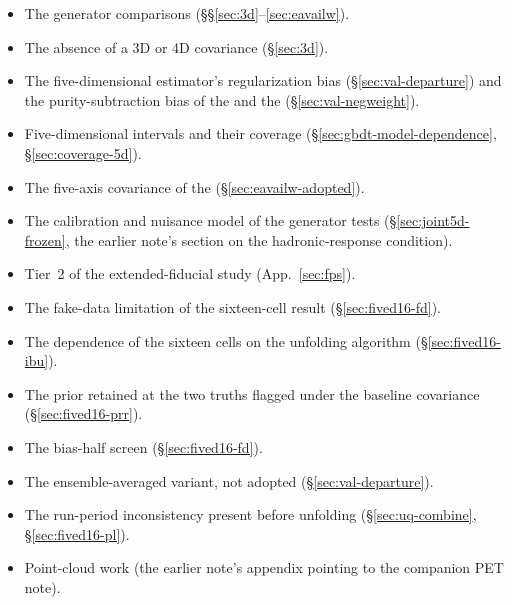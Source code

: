 \begin{itemize}
\item The generator comparisons (\S\S\ref{sec:3d}--\ref{sec:eavailw}).
\item The absence of a 3D or 4D covariance (\S\ref{sec:3d}).
\item The five-dimensional estimator's regularization bias (\S\ref{sec:val-departure}) and the purity-subtraction bias of the \estPurity{} and the \estDetPurity{} (\S\ref{sec:val-negweight}).
\item Five-dimensional intervals and their coverage (\S\ref{sec:gbdt-model-dependence}, \S\ref{sec:coverage-5d}).
\item The five-axis covariance of the \resFiveAxis{} (\S\ref{sec:eavailw-adopted}).
\item The calibration and nuisance model of the generator tests (\S\ref{sec:joint5d-frozen}, the earlier note's section on the hadronic-response condition).
\item Tier~2 of the extended-fiducial study (App.~\ref{sec:fps}).
\item The fake-data limitation of the sixteen-cell result (\S\ref{sec:fived16-fd}).
\item The dependence of the sixteen cells on the unfolding algorithm (\S\ref{sec:fived16-ibu}).
\item The prior retained at the two truths flagged under the baseline covariance (\S\ref{sec:fived16-prr}).
\item The bias-half screen (\S\ref{sec:fived16-fd}).
\item The ensemble-averaged variant, not adopted (\S\ref{sec:val-departure}).
\item The run-period inconsistency present before unfolding (\S\ref{sec:uq-combine}, \S\ref{sec:fived16-pl}).
\item Point-cloud work (the earlier note's appendix pointing to the companion PET note).
\end{itemize}
